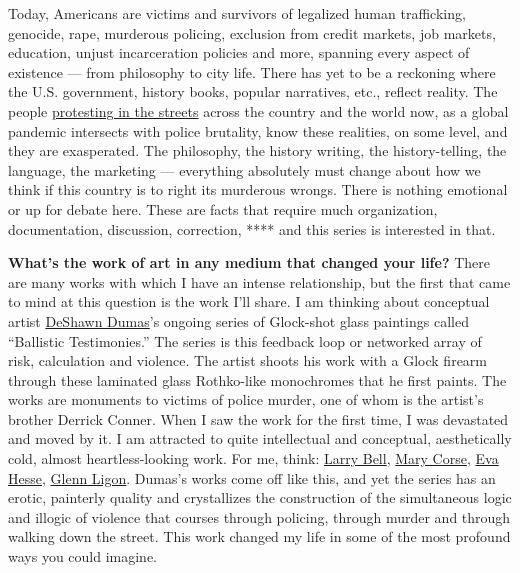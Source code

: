 Today, Americans are victims and survivors of legalized human
trafficking, genocide, rape, murderous policing, exclusion from credit
markets, job markets, education, unjust incarceration policies and more,
spanning every aspect of existence --- from philosophy to city life.
There has yet to be a reckoning where the U.S. government, history
books, popular narratives, etc., reflect reality. The people
\href{https://www.nytimes3xbfgragh.onion/interactive/2020/07/03/us/george-floyd-protests-crowd-size.html}{protesting
in the streets} across the country and the world now, as a global
pandemic intersects with police brutality, know these realities, on some
level, and they are exasperated. The philosophy, the history writing,
the history-telling, the language, the marketing --- everything
absolutely must change about how we think if this country is to right
its murderous wrongs. There is nothing emotional or up for debate here.
These are facts that require much organization, documentation,
discussion, correction, **** and this series is interested in that.

\textbf{What's the work of art in any medium that changed your life?}
There are many works with which I have an intense relationship, but the
first that came to mind at this question is the work I'll share. I am
thinking about conceptual artist
\href{http://www.deshawndumas.com/}{DeShawn Dumas}'s ongoing series of
Glock-shot glass paintings called ``Ballistic Testimonies.'' The series
is this feedback loop or networked array of risk, calculation and
violence. The artist shoots his work with a Glock firearm through these
laminated glass Rothko-like monochromes that he first paints. The works
are monuments to victims of police murder, one of whom is the artist's
brother Derrick Conner. When I saw the work for the first time, I was
devastated and moved by it. I am attracted to quite intellectual and
conceptual, aesthetically cold, almost heartless-looking work. For me,
think:
\href{https://www.nytimes3xbfgragh.onion/2018/06/15/t-magazine/mary-heilmann-larry-bell-conversation.html}{Larry
Bell},
\href{https://tmagazine.blogs.nytimes3xbfgragh.onion/2012/02/24/artifacts-mary-corse/}{Mary
Corse},
\href{https://tmagazine.blogs.nytimes3xbfgragh.onion/2010/03/25/just-looking-eva-hesse/}{Eva
Hesse},
\href{https://www.nytimes3xbfgragh.onion/2018/06/18/t-magazine/glenn-ligon-adrian-piper-art.html}{Glenn
Ligon}. Dumas's works come off like this, and yet the series has an
erotic, painterly quality and crystallizes the construction of the
simultaneous logic and illogic of violence that courses through
policing, through murder and through walking down the street. This work
changed my life in some of the most profound ways you could imagine.

